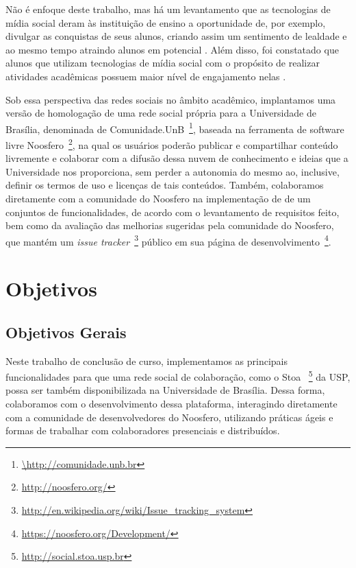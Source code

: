  
 
Não é enfoque deste trabalho, mas há um levantamento que as tecnologias de mídia social deram às
instituição de ensino a oportunidade de, por exemplo, divulgar as conquistas de seus alunos,
criando assim um sentimento de lealdade e ao mesmo tempo atraindo alunos em
potencial \cite{solis2008}. 
%
Além disso, foi constatado que alunos que utilizam tecnologias de mídia social
com o propósito de realizar atividades acadêmicas possuem maior nível de
engajamento nelas  \cite{ccsse2009}. 
 
 
Sob essa perspectiva das redes sociais no âmbito acadêmico, implantamos uma versão de homologação
de uma rede social própria para a Universidade de
Brasília, denominada de Comunidade.UnB~\footnote{\url{\http://comunidade.unb.br}}, baseada na ferramenta de software livre 
Noosfero~\footnote{\url{http://noosfero.org/}},
na qual os usuários poderão publicar e compartilhar conteúdo livremente e
colaborar com a difusão dessa nuvem de conhecimento e ideias que a Universidade
nos proporciona, sem perder a autonomia do mesmo ao, inclusive, definir os termos
de uso e licenças de tais conteúdos.
%
Também, colaboramos diretamente com a comunidade do Noosfero na implementação de
de um conjuntos de funcionalidades, de acordo com o levantamento de requisitos feito,
bem como da avaliação das melhorias sugeridas pela comunidade do Noosfero, que mantém
um \textit{issue tracker}~\footnote{\url{http://en.wikipedia.org/wiki/Issue_tracking_system}}
público em sua página de desenvolvimento~\footnote{\url{https://noosfero.org/Development/}}.
 
 
\section{Objetivos}
 
\subsection{Objetivos Gerais}
 
Neste trabalho de conclusão de curso, implementamos as
principais funcionalidades para que uma rede social de colaboração, como o Stoa
~\footnote{\url{http://social.stoa.usp.br}} da USP, 
possa ser também disponibilizada na Universidade de Brasília. 
%
Dessa forma, colaboramos com o desenvolvimento dessa plataforma, interagindo diretamente com
a  comunidade de desenvolvedores do Noosfero, utilizando práticas ágeis e formas de trabalhar
com colaboradores presenciais e distribuídos.
 
